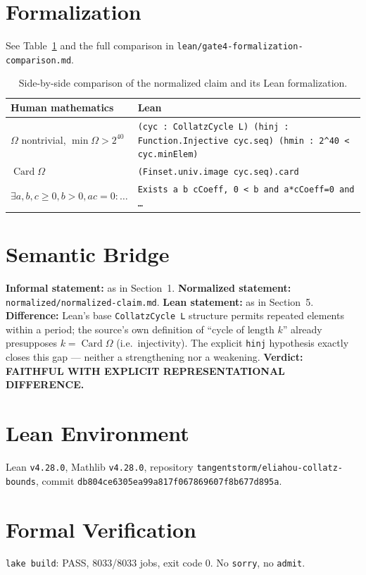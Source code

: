 \documentclass[11pt]{article}
\begin{document}
\section{Formalization}
See Table~\ref{tab:sidebyside} and the full comparison in \texttt{lean/gate4-formalization-comparison.md}.
\begin{table}[h]
\centering
\begin{tabular}{p{6.5cm}p{7cm}}
\toprule
Human mathematics & Lean \\
\midrule
$\Omega$ nontrivial, $\min\Omega>2^{40}$ & \texttt{(cyc : CollatzCycle L) (hinj : Function.Injective cyc.seq) (hmin : 2\^{}40 < cyc.minElem)} \\
$\operatorname{Card}\Omega$ & \texttt{(Finset.univ.image cyc.seq).card} \\
$\exists a,b,c\ge0,b>0,ac=0:\ldots$ & \texttt{Exists a b cCoeff, 0 < b and a*cCoeff=0 and \ldots} \\
\bottomrule
\end{tabular}
\caption{Side-by-side comparison of the normalized claim and its Lean formalization.}
\label{tab:sidebyside}
\end{table}

\section{Semantic Bridge}
\textbf{Informal statement:} as in Section~1. \textbf{Normalized statement:} \texttt{normalized/normalized-claim.md}. \textbf{Lean statement:} as in Section~5. \textbf{Difference:} Lean's base \texttt{CollatzCycle L} structure permits repeated elements within a period; the source's own definition of ``cycle of length $k$'' already presupposes $k=\operatorname{Card}\Omega$ (i.e.\ injectivity). The explicit \texttt{hinj} hypothesis exactly closes this gap --- neither a strengthening nor a weakening. \textbf{Verdict: FAITHFUL WITH EXPLICIT REPRESENTATIONAL DIFFERENCE.}

\section{Lean Environment}
Lean \texttt{v4.28.0}, Mathlib \texttt{v4.28.0}, repository \texttt{tangentstorm/eliahou-collatz-bounds}, commit \texttt{db804ce6305ea99a817f067869607f8b677d895a}.

\section{Formal Verification}
\texttt{lake build}: PASS, 8033/8033 jobs, exit code 0. No \texttt{sorry}, no \texttt{admit}.
\end{document}
